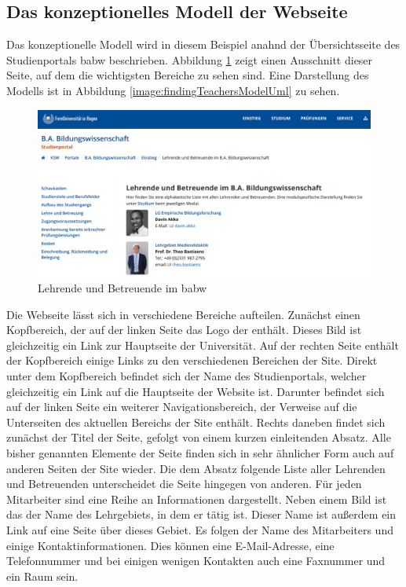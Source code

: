 \subsection{Das konzeptionelles Modell der Webseite}
    Das konzeptionelle Modell wird in diesem Beispiel anahnd
    der Übersichtsseite des Studienportals \gls{babw} beschrieben.
    Abbildung \ref{image:findingTeachersModelOverview} zeigt einen
    Ausschnitt dieser Seite, auf dem die wichtigsten Bereiche zu sehen sind.
    Eine Darstellung des Modells ist in Abbildung
    \ref{image:findingTeachersModelUml} zu sehen.

    \begin{figure}[htb]
        \centering
        \includegraphics[width=\textwidth]{../resources/findings/case-study-1/model/overview.png}
        \caption{Lehrende und Betreuende im \gls{babw}}
        \label{image:findingTeachersModelOverview}
    \end{figure}

    Die Webseite lässt sich in verschiedene Bereiche aufteilen.
    Zunächst einen Kopfbereich, der auf der linken Seite das Logo
    der {\fernUni} enthält.
    Dieses Bild ist gleichzeitig ein Link zur Hauptseite der Universität. 
    Auf der rechten Seite enthält der Kopfbereich einige Links zu den verschiedenen
    Bereichen der Site.
    Direkt unter dem Kopfbereich befindet sich der Name des Studienportals,
    welcher gleichzeitig ein Link auf die Hauptseite der Website ist.
    Darunter befindet sich auf der linken Seite ein weiterer Navigationsbereich,
    der Verweise auf die Unterseiten des aktuellen Bereichs der Site enthält.
    Rechts daneben findet sich zunächst der Titel der Seite,
    gefolgt von einem kurzen einleitenden Absatz.
    Alle bisher genannten Elemente der Seite finden sich in sehr ähnlicher Form
    auch auf anderen Seiten der Site wieder.
    Die dem Absatz folgende Liste aller Lehrenden und Betreuenden unterscheidet die Seite hingegen von anderen.
    Für jeden Mitarbeiter sind eine Reihe an Informationen dargestellt.
    Neben einem Bild ist das der Name des Lehrgebiets, in dem er tätig ist.
    Dieser Name ist außerdem ein Link auf eine Seite über dieses Gebiet.
    Es folgen der Name des Mitarbeiters
    und einige Kontaktinformationen.
    Dies können eine E-Mail-Adresse, eine Telefonnummer
    und bei einigen wenigen Kontakten auch eine Faxnummer und ein Raum sein.

